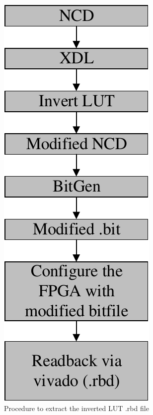 \begin{figure}[tb!]
 \centering
  \captionsetup{justification=centering}    
   \includegraphics[scale = 0.5]{Figures/inverted-rbd.pdf}
   \caption{Procedure to extract the inverted LUT .rbd file}
\label{fig:inverted-rbd}
\end{figure}





